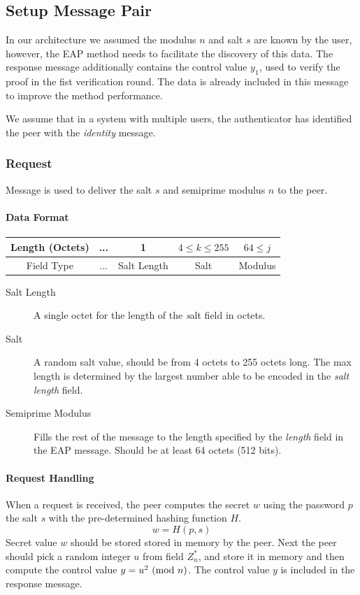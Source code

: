 \subsection{Setup Message Pair}
In our architecture we assumed the modulus $n$ and salt $s$ are known by the user, however, the EAP method needs to facilitate the discovery of this data.
The response message additionally contains the control value $y_1$, used to verify the proof in the fist verification round. The data is already included in this message to improve the method performance.

We assume that in a system with multiple users, the authenticator has identified the peer with the \textit{identity} message.

\subsubsection{Request} Message is used to deliver the salt $s$ and semiprime modulus $n$ to the peer.

\paragraph{Data Format}

\begin{center}
\begin{tabular}{|c|c|c|c|c|}
	\hline
	Length (Octets) & ... & 1 & $4 \le k \le 255 $ & $64 \le j$\\
	\hline
	Field Type & ... & Salt Length & Salt & Modulus\\
	\hline
\end{tabular}
\end{center}

\begin{description}
	\item[Salt Length] A single octet for the length of the \textit salt field in octets.
	\item[Salt] A random salt value, should be from 4 octets to 255 octets long.
The max length is determined by the largest number able to be encoded in the \textit {salt length} field.
	\item[Semiprime Modulus] Fills the rest of the message to the length specified by the \textit{length} field in the EAP message. 
Should be at least 64 octets (512 bits).
\end{description}

\paragraph{Request Handling} When a request is received, the peer computes the secret $w$ using the password $p$ the salt $s$ with the pre-determined hashing function $H$.
$$w = H(p, s)$$
Secret value $w$ should be stored stored in memory by the peer. 
Next the peer should pick a random integer $u$ from field $Z^*_n$, and store it in memory and then compute the control value $y = u^2 \ (\mathrm{mod}\ n)$.
The control value $y$ is included in the response message.

